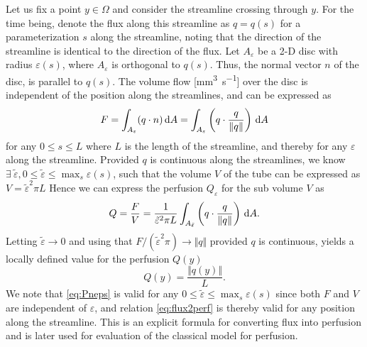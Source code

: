 \documentclass[paper=a4, fontsize=11pt,parskip=half,headings=small]{scrartcl}
\newcommand{\Perf}{Q}
\newcommand{\siFmm}{\milli\meter\cubed\per\second}
\begin{document}
	Let us fix a point $y \in \Omega$ and consider the streamline crossing through $y$. For the time being, denote the flux along this streamline as $q = q(s)$ for a parameterization $s$ along the streamline, noting that the direction of the streamline is identical to the direction of the flux.
	Let $A_\varepsilon$ be a 2-D disc with radius $\varepsilon(s)$, where  $A_\varepsilon$ is orthogonal to $q(s)$. Thus, the normal vector $n$ of the disc, is parallel to $q(s)$.
	The volume flow [\si{\siFmm}] over the disc is independent of the position along the streamlines, and can be expressed as
	\begin{equation}
		F = \int_{A_\varepsilon} (q \cdot n) \,\mathrm{d} A = \int_{A_\varepsilon} \left(q\cdot \frac{q}{\Vert q \Vert}\right) \,\mathrm{d} A
	\end{equation}
	for any $0 \leq s \leq L$ where $L$ is the length of the streamline, and thereby for any $\varepsilon$ along the streamline.
	Provided $q$ is continuous along the streamlines, we know $\exists ~ \tilde{\varepsilon}, 0 \leq \tilde{\varepsilon} \leq \max_s \varepsilon(s)$, such that the volume $V$ of the tube can be expressed as $V = \tilde{\varepsilon}^2\pi L$
	Hence we can express the perfusion $\Perf_{\varepsilon}$ for the sub volume $V$ as
	\begin{equation}
		\Perf= \frac{F}{V} = \frac{1}{\tilde{\varepsilon}^2 \pi L} \int_{A_{\tilde{\varepsilon}}} \left( q\cdot \frac{q}{\Vert q \Vert} \right) \diffint A. 
		\label{eq:Pneps}
	\end{equation}
	Letting $\tilde{\varepsilon} \to 0$ and using that $F/(\tilde{\varepsilon}^2\pi) \rightarrow \Vert q \Vert$ provided $q$ is continuous, yields a locally defined value for the perfusion $\Perf (y)$
	\begin{equation}
		\Perf(y) = \frac{\Vert q(y) \Vert}{L}.
		\label{eq:flux2perf}
	\end{equation}
	We note that \eqref{eq:Pneps} is valid for any $0 \leq \tilde{\varepsilon} \leq \max_s \varepsilon(s)$ since both $F$ and $V$ are independent of $\varepsilon$, and relation \eqref{eq:flux2perf} is thereby valid for any position along the streamline.
	This is an explicit formula for converting flux into perfusion and is later used for evaluation of the classical model for perfusion. 
	
	
	
\end{document}
